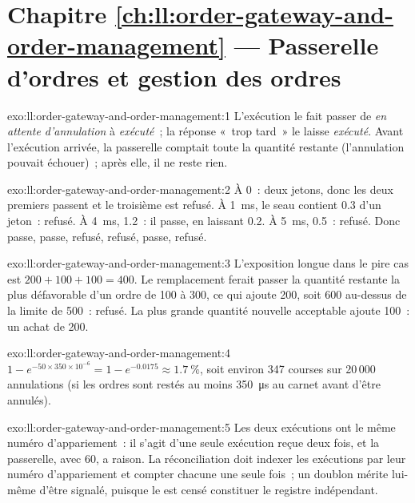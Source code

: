 \section*{Chapitre \ref{ch:ll:order-gateway-and-order-management} --- Passerelle d'ordres et gestion des ordres}

\begin{solution}{exo:ll:order-gateway-and-order-management:1}
L'exécution le fait passer de \emph{en attente d'annulation} à \emph{exécuté}~; la réponse «~trop tard~» le laisse \emph{exécuté}. Avant l'exécution
arrivée, la passerelle comptait toute la quantité restante (l'annulation pouvait échouer)~; après elle, il ne reste rien.
\end{solution}

\begin{solution}{exo:ll:order-gateway-and-order-management:2}
À 0~: deux jetons, donc les deux premiers passent et le troisième est refusé. À \qty{1}{\milli\second}, le seau contient 0.3 d'un
jeton~: refusé. À \qty{4}{\milli\second}, 1.2~: il passe, en laissant 0.2. À \qty{5}{\milli\second}, 0.5~: refusé. Donc
passe, passe, refusé, refusé, passe, refusé.
\end{solution}

\begin{solution}{exo:ll:order-gateway-and-order-management:3}
L'exposition longue dans le pire cas est $200 + 100 + 100 = 400$. Le remplacement ferait passer la quantité restante la plus défavorable d'un ordre de 100 à
300, ce qui ajoute 200, soit 600 au-dessus de la limite de 500~: refusé. La plus grande quantité nouvelle acceptable ajoute 100~: un achat de 200.
\end{solution}

\begin{solution}{exo:ll:order-gateway-and-order-management:4}
$1 - e^{-50 \times 350 \times 10^{-6}} = 1 - e^{-0.0175} \approx 1.7~\%$, soit environ 347 courses sur 20\,000 annulations (si les ordres
sont restés au moins \qty{350}{\micro\second} au carnet avant d'être annulés).
\end{solution}

\begin{solution}{exo:ll:order-gateway-and-order-management:5}
Les deux exécutions ont le même numéro d'appariement~: il s'agit d'une seule exécution reçue deux fois, et la passerelle, avec 60, a raison.
La réconciliation doit indexer les exécutions par leur numéro d'appariement et compter chacune une seule fois~; un doublon mérite lui-même d'être signalé,
puisque le  est censé constituer le registre indépendant.
\end{solution}

